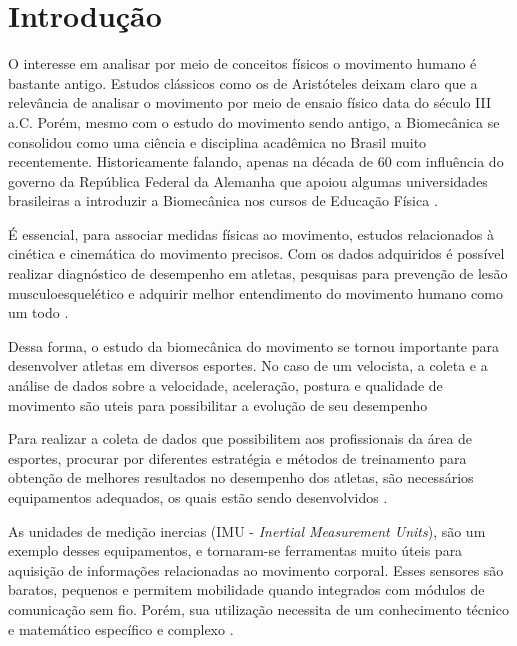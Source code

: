 
\chapter[Introdução]{Introdução}

O interesse em analisar por meio de conceitos físicos o movimento humano é bastante antigo. Estudos clássicos como os de Aristóteles deixam claro que a relevância de analisar o movimento por meio de ensaio físico data do século III a.C. Porém, mesmo com o estudo do movimento sendo antigo, a Biomecânica se consolidou como uma ciência e disciplina acadêmica no Brasil muito recentemente. Historicamente falando, apenas na década de 60 com influência do governo da República Federal da Alemanha que apoiou algumas universidades brasileiras a introduzir a Biomecânica nos cursos de Educação Física \cite{Acquesta2008}.

É essencial, para associar medidas físicas ao movimento,  estudos relacionados à cinética e cinemática do movimento precisos. Com os dados adquiridos é possível realizar diagnóstico de desempenho em atletas, pesquisas para prevenção de lesão musculoesquelético e adquirir melhor entendimento do movimento humano como um todo \cite{mcginnis2013}.

Dessa forma, o estudo da biomecânica do movimento se tornou importante para desenvolver atletas em diversos esportes. No caso de um velocista, a coleta e a análise de dados sobre a velocidade, aceleração, postura e qualidade de movimento são uteis para possibilitar a evolução de seu desempenho \cite{okazaki2012}

Para realizar a coleta de dados que possibilitem aos profissionais da área de esportes, procurar por diferentes estratégia e métodos de treinamento para obtenção de melhores resultados no desempenho dos atletas, são necessários equipamentos adequados, os quais estão sendo desenvolvidos \cite{okazaki2012}.  


As unidades de medição inercias (IMU - \textit{Inertial Measurement Units}), são um exemplo desses equipamentos, e tornaram-se ferramentas muito úteis para aquisição de informações relacionadas ao movimento corporal. Esses sensores são baratos, pequenos e permitem mobilidade quando integrados com módulos de comunicação sem fio. Porém, sua utilização necessita de um conhecimento técnico e matemático específico e complexo \cite{ober2015}.

